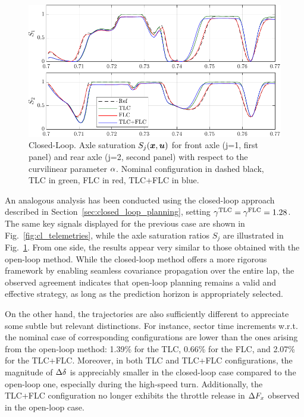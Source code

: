 \begin{figure}[b!]
	\centering
	\includegraphics[scale = 1.005]{Fig/cl_saturation.pdf}
	\caption{Closed-Loop. Axle saturation $S_j(\boldsymbol{x},\boldsymbol{u})$ for front axle (j=1, first panel) and rear axle (j=2, second panel) with respect to the curvilinear parameter $\alpha$. Nominal configuration in dashed black, TLC in green, FLC in red, TLC+FLC in blue.
	}
	\label{fig:cl_saturation}
\end{figure}

An analogous analysis has been conducted using the closed-loop approach described in Section~\ref{sec:closed_loop_planning}, setting $\gamma^\textrm{TLC}=\gamma^\textrm{FLC}=1.28$.
The same key signals displayed for the previous case are shown in Fig.~\ref{fig:cl_telemetries}, while the axle saturation ratios $S_j$ are illustrated in Fig.~\ref{fig:cl_saturation}.
From one side, the results appear very similar to those obtained with the open-loop method. While the closed-loop method offers a more rigorous framework by enabling seamless covariance propagation over the entire lap, the observed agreement indicates that open-loop planning remains a valid and effective strategy, as long as the prediction horizon is appropriately selected.

On the other hand, the trajectories are also sufficiently different to appreciate some subtle but relevant distinctions. For instance, sector time increments w.r.t. the nominal case of corresponding configurations are lower than the ones arising from the open-loop method: 1.39\% for the TLC, 0.66\% for the FLC, and 2.07\% for the TLC+FLC.
Moreover, in both TLC and TLC+FLC configurations, the magnitude of $\Delta\delta$ is appreciably smaller in the closed-loop case compared to the open-loop one, especially during the high-speed turn.
Additionally, the TLC+FLC configuration no longer exhibits the throttle release in $\Delta F_x$ observed in the open-loop case.

